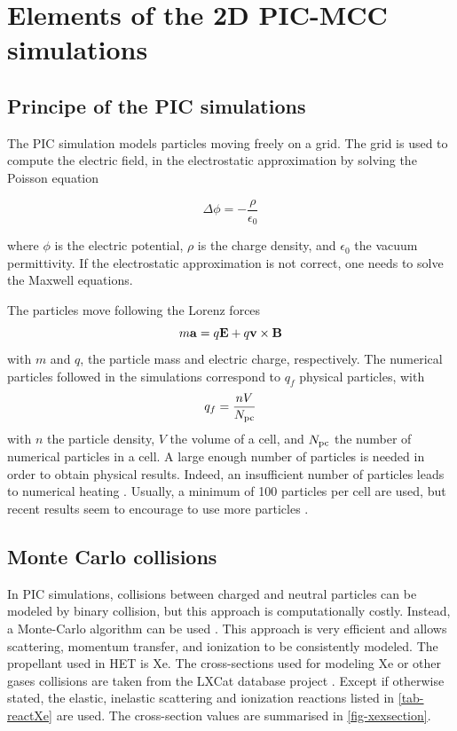 
\section{Elements of the 2D PIC-MCC simulations}
  \label{sec-elements}
  \subsection{Principe of the PIC simulations}

    The \ac{PIC} simulation models particles moving freely on a grid.
    The grid is used to compute the electric field, in the electrostatic approximation by solving the Poisson equation

    \begin{equation}
      \label{eq-poisson}
      \Delta \phi = - \frac{\rho}{\epsilon_0}
    \end{equation}

    where $\phi$ is the electric potential, $\rho$ is the charge density, and $\epsilon_0$ the vacuum permittivity.
    If the electrostatic approximation is not correct, one needs to solve the Maxwell equations.

    The particles move following the Lorenz forces
    \begin{equation}
      \label{eq-Lor}
      m {\bf a} = q {\mathbf E} + q {\bf v} \times {\bf B}
    \end{equation}
    with $m$ and $q$, the particle mass and electric charge, respectively.
    The numerical particles followed in the simulations correspond to $q_f$ physical particles, with
    \begin{equation}
      q_f = \frac{n V}{N_{\rm pc}}
    \end{equation}
    with $n$ the particle density, $V$ the volume of a cell, and $N_{\rm pc}$ the number of numerical particles in a cell.
    A large enough number of particles is needed in order to obtain physical results.
    Indeed, an insufficient number of particles leads to numerical heating \cite{ueda1994}.
    Usually, a minimum of 100 particles per cell are used, but recent results seem to encourage to use more particles \cite{janhunen2018}.

  \subsection{Monte Carlo collisions}

    In \ac{PIC} simulations, collisions between charged and neutral particles can be modeled by binary collision, but this approach is computationally costly.
    Instead, a Monte-Carlo algorithm can be used \cite{vahedi1995}.
    This approach is very efficient and allows scattering, momentum transfer, and ionization to be consistently modeled.
    The propellant used in \ac{HET} is \ac{Xe}.
    The cross-sections used for modeling \ac{Xe} or other gases collisions are taken from the {\sc LXCat} database project \cite{LXCat_web,pancheshnyi2012}.
    Except if otherwise stated, the elastic, inelastic scattering and ionization reactions listed in \cref{tab-reactXe} are used.
    The cross-section values are summarised in \cref{fig-xexsection}.

